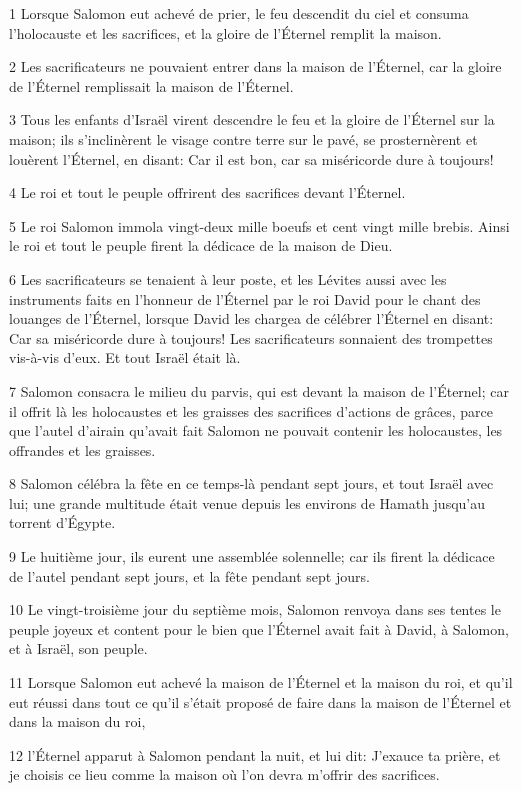 \par 1 Lorsque Salomon eut achevé de prier, le feu descendit du ciel et consuma l'holocauste et les sacrifices, et la gloire de l'Éternel remplit la maison.
\par 2 Les sacrificateurs ne pouvaient entrer dans la maison de l'Éternel, car la gloire de l'Éternel remplissait la maison de l'Éternel.
\par 3 Tous les enfants d'Israël virent descendre le feu et la gloire de l'Éternel sur la maison; ils s'inclinèrent le visage contre terre sur le pavé, se prosternèrent et louèrent l'Éternel, en disant: Car il est bon, car sa miséricorde dure à toujours!
\par 4 Le roi et tout le peuple offrirent des sacrifices devant l'Éternel.
\par 5 Le roi Salomon immola vingt-deux mille boeufs et cent vingt mille brebis. Ainsi le roi et tout le peuple firent la dédicace de la maison de Dieu.
\par 6 Les sacrificateurs se tenaient à leur poste, et les Lévites aussi avec les instruments faits en l'honneur de l'Éternel par le roi David pour le chant des louanges de l'Éternel, lorsque David les chargea de célébrer l'Éternel en disant: Car sa miséricorde dure à toujours! Les sacrificateurs sonnaient des trompettes vis-à-vis d'eux. Et tout Israël était là.
\par 7 Salomon consacra le milieu du parvis, qui est devant la maison de l'Éternel; car il offrit là les holocaustes et les graisses des sacrifices d'actions de grâces, parce que l'autel d'airain qu'avait fait Salomon ne pouvait contenir les holocaustes, les offrandes et les graisses.
\par 8 Salomon célébra la fête en ce temps-là pendant sept jours, et tout Israël avec lui; une grande multitude était venue depuis les environs de Hamath jusqu'au torrent d'Égypte.
\par 9 Le huitième jour, ils eurent une assemblée solennelle; car ils firent la dédicace de l'autel pendant sept jours, et la fête pendant sept jours.
\par 10 Le vingt-troisième jour du septième mois, Salomon renvoya dans ses tentes le peuple joyeux et content pour le bien que l'Éternel avait fait à David, à Salomon, et à Israël, son peuple.
\par 11 Lorsque Salomon eut achevé la maison de l'Éternel et la maison du roi, et qu'il eut réussi dans tout ce qu'il s'était proposé de faire dans la maison de l'Éternel et dans la maison du roi,
\par 12 l'Éternel apparut à Salomon pendant la nuit, et lui dit: J'exauce ta prière, et je choisis ce lieu comme la maison où l'on devra m'offrir des sacrifices.
